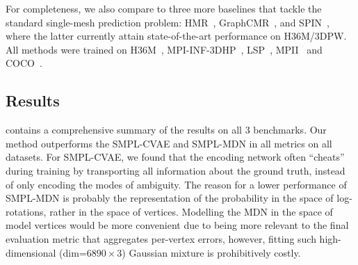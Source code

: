 For completeness, we also compare to three more baselines that tackle the standard single-mesh prediction problem:
HMR~\cite{kanazawa18end-to-end}, GraphCMR~\cite{pavlakos18learning}, and SPIN~\cite{kolotouros19learning}, where the latter currently attain state-of-the-art performance on H36M/3DPW. All methods were trained on H36M~\cite{ionescu2013human3}, MPI-INF-3DHP~\cite{mono-3dhp2017}, LSP~\cite{Johnson11}, MPII~\cite{andriluka14cvpr} and COCO~\cite{lin2014microsoft}.



% 


\vspace{-0.25cm} %
\subsection{Results}\label{s:exp_results}
 contains a comprehensive summary of the results on all 3 benchmarks. Our method outperforms the SMPL-CVAE and SMPL-MDN in all metrics on all datasets.
For SMPL-CVAE, we found that the encoding network often ``cheats'' during training by transporting all information about the ground truth, instead of only encoding the modes of ambiguity.
The reason for a lower performance of SMPL-MDN is probably the representation of the probability in the space of log-rotations, rather in the space of vertices.
Modelling the MDN in the space of model vertices would be more convenient due to being more relevant to the final evaluation metric that aggregates per-vertex errors, however, fitting such high-dimensional (dim=$6890 \times 3$) Gaussian mixture is prohibitively costly. 

